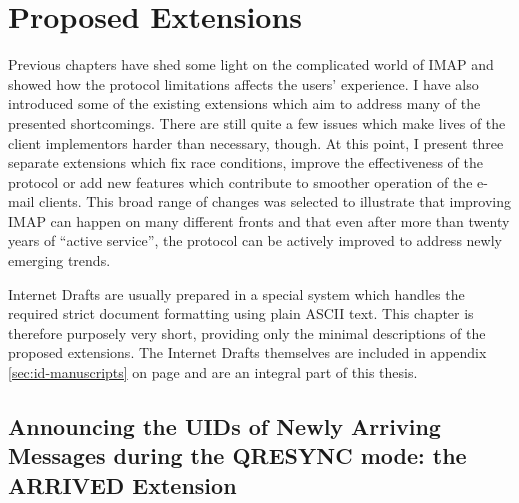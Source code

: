 \documentclass[trojita]{subfiles}
\begin{document}
\chapter{Proposed Extensions}
\label{sec:proposed-extensions}

Previous chapters have shed some light on the complicated world of IMAP and showed how the protocol limitations affects
the users' experience.  I have also introduced some of the existing extensions which aim to address many of the
presented shortcomings.  There are still quite a few issues which make lives of the client implementors harder than
necessary, though.  At this point, I present three separate extensions which fix race conditions, improve the
effectiveness of the protocol or add new features which contribute to smoother operation of the e-mail clients.  This
broad range of changes was selected to illustrate that improving IMAP can happen on many different fronts and that even
after more than twenty years of ``active service'', the protocol can be actively improved to address newly emerging
trends.

Internet Drafts are usually prepared in a special system \cite{rfc-formatting} which handles the required strict
document formatting using plain ASCII text.  This chapter is therefore purposely very short, providing only the minimal
descriptions of the proposed extensions.  The Internet Drafts themselves are included in appendix
\ref{sec:id-manuscripts} on page \pageref{sec:id-manuscripts} and are an integral part of this thesis.

\section{Announcing the UIDs of Newly Arriving Messages during the QRESYNC mode: the ARRIVED Extension}
\label{sec:draft-arrived}
\end{document}

